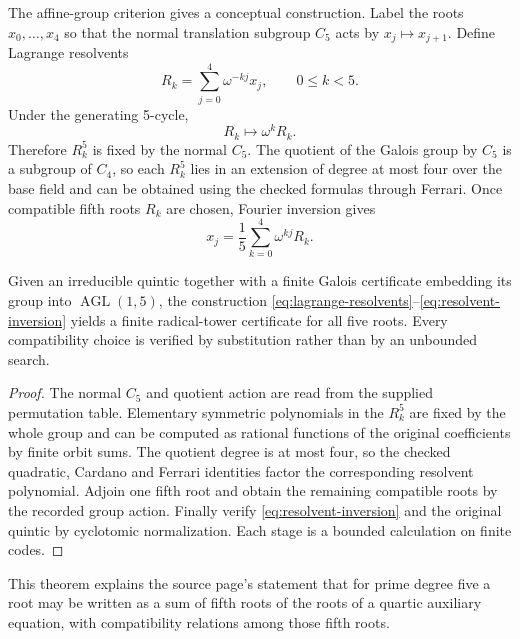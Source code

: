The affine-group criterion gives a conceptual construction.  Label the roots
\(x_0,\ldots,x_4\) so that the normal translation subgroup \(C_5\) acts by
\(x_j\mapsto x_{j+1}\).  Define Lagrange resolvents
\begin{equation}\label{eq:lagrange-resolvents}
 R_k=\sum_{j=0}^4\omega^{-kj}x_j,
 \qquad 0\le k<5.
\end{equation}
Under the generating 5-cycle,
\[
 R_k\longmapsto\omega^kR_k.
\]
Therefore \(R_k^5\) is fixed by the normal \(C_5\).  The quotient of the
Galois group by \(C_5\) is a subgroup of \(C_4\), so each \(R_k^5\) lies in an
extension of degree at most four over the base field and can be obtained using
the checked formulas through Ferrari.  Once compatible fifth roots \(R_k\)
are chosen, Fourier inversion gives
\begin{equation}\label{eq:resolvent-inversion}
 x_j=\frac15\sum_{k=0}^4\omega^{kj}R_k.
\end{equation}

\begin{theorem}
\label{thm:solvable-quintic-resolvents}
Given an irreducible quintic together with a finite Galois certificate embedding
its group into \(\operatorname{AGL}(1,5)\), the construction
\eqref{eq:lagrange-resolvents}--\eqref{eq:resolvent-inversion} yields a finite
radical-tower certificate for all five roots.  Every compatibility choice is
verified by substitution rather than by an unbounded search.
\end{theorem}

\begin{proof}
The normal \(C_5\) and quotient action are read from the supplied permutation
table.  Elementary symmetric polynomials in the \(R_k^5\) are fixed by the
whole group and can be computed as rational functions of the original
coefficients by finite orbit sums.  The quotient degree is at most four, so the
checked quadratic, Cardano and Ferrari identities factor the corresponding
resolvent polynomial.  Adjoin one fifth root and obtain the remaining
compatible roots by the recorded group action.  Finally verify
\eqref{eq:resolvent-inversion} and the original quintic by cyclotomic
normalization.  Each stage is a bounded calculation on finite codes.
\end{proof}

This theorem explains the source page's statement that for prime degree five a
root may be written as a sum of fifth roots of the roots of a quartic auxiliary
equation, with compatibility relations among those fifth roots.

